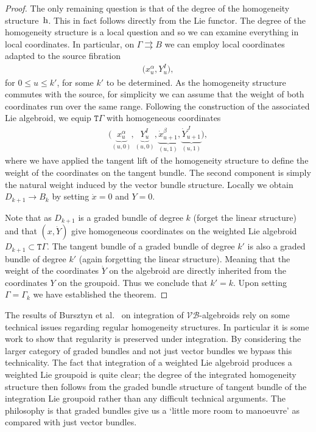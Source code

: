 \documentclass[10pt,a4paper]{amsart}
\newcommand{\rmh}{\textnormal{h}}
\def\sT{{\mathtt T}}
\numberwithin{equation}{section}
\begin{document}
\begin{proof}
 The only remaining question is that of the degree of the homogeneity structure~$\rmh$. This in fact follows directly from the Lie functor. The degree of the homogeneity structure is a local question and so we can examine everything in local coordinates.  In particular, on $\Gamma \rightrightarrows B$ we can employ local  coordinates adapted to the source f\/ibration
\begin{gather*}
\big(x^{\alpha}_{u},  Y_{u}^{I}\big),
\end{gather*}
\noindent for $0 \leq u \leq k'$, for some $k'$ to be determined. As the homogeneity structure commutes with the source, for simplicity we can assume that the weight of both coordinates run over the same range.  Following the construction of the associated Lie algebroid, we equip $\sT \Gamma$ with homogeneous coordinates
\begin{gather*}
\big(\underbrace{x^{\alpha}_{u}}_{(u,0)},  \underbrace{Y_{u}^{I}}_{(u,0)},  \underbrace{\dot{x}^{\beta}_{u+1}}_{(u,1)},  \underbrace{\dot{Y}_{u+1}^{J}}_{(u,1)} \big),
 \end{gather*}
where we have applied the tangent lift of the homogeneity structure to def\/ine the weight of the coordinates on the tangent bundle. The second component is simply the natural weight induced by the vector bundle structure. Locally we obtain $D_{k+1} \rightarrow B_{k}$ by setting $\dot{x} =0$ and $Y =0$.

Note that as $D_{k+1}$ is a graded bundle of degree $k$ (forget the linear structure) and that $(x, \dot{Y})$ give homogeneous coordinates on the weighted Lie algebroid $D_{k+1} \subset \sT \Gamma$. The tangent bundle of a graded bundle of degree $k'$ is also a graded bundle of degree $k'$ (again forgetting the linear structure).  Meaning that the weight of the coordinates $\dot{Y}$ on the algebroid are directly inherited from the coordinates $Y$ on the groupoid.  Thus we conclude that $k' = k$.   Upon setting $\Gamma = \Gamma_{k}$ we have established the theorem.
\end{proof}



\begin{Remark}
The results of  Bursztyn  et al.~\cite{Bursztyn:2014} on integration of $\mathcal{VB}$-algebroids rely on some technical issues regarding regular homogeneity structures. In particular it is some work to show  that regularity is preserved under integration.  By considering the larger category of graded bundles and not just vector bundles we bypass this technicality. The fact that integration of a weighted Lie algebroid produces a weighted Lie groupoid is quite clear; the degree of the integrated homogeneity structure then follows from the graded bundle structure of tangent bundle of the integration Lie groupoid rather than any dif\/f\/icult technical arguments.  The philosophy is that graded bundles give us a `little more room to manoeuvre'  as compared with just vector bundles.
\end{Remark}
\end{document}
